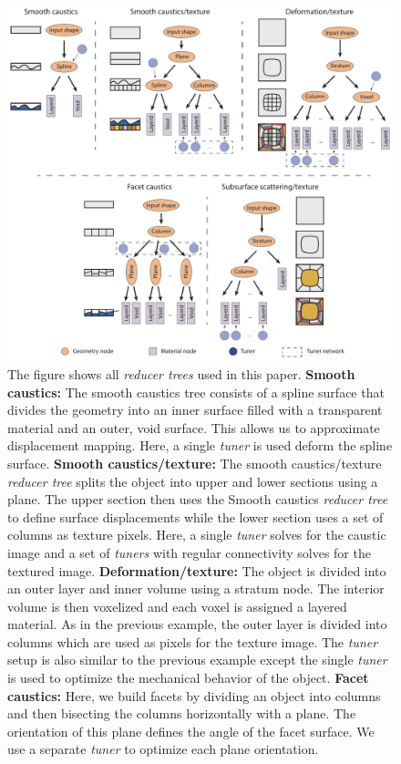 \begin{figure}[t]
\centering
\includegraphics*[clip, width = \linewidth]{figure/ReducerNetworksSuplemental}
\caption{The figure shows all \emph{reducer trees} used in this paper.
\textbf{Smooth caustics:} The smooth caustics tree consists of a spline surface that divides the geometry into an inner surface filled with a transparent material and an outer, void surface. This allows us to approximate displacement mapping.  Here, a single \emph{tuner} is used deform the spline surface.
\textbf{Smooth caustics/texture:} The smooth caustics/texture \emph{reducer tree} splits the object into upper and lower sections using a plane. The upper section then uses the Smooth caustics \emph{reducer tree} to define surface displacements while the lower section uses a set of columns as texture pixels. Here, a single \emph{tuner} solves for the caustic image and a set of \emph{tuners} with regular connectivity solves for the textured image.  \textbf{Deformation/texture:} The object is divided into an outer layer and inner volume using a stratum node. The interior volume is then voxelized and each voxel is assigned a layered material. As in the previous example, the outer layer is divided into columns which are used as pixels for the texture image. The \emph{tuner} setup is also similar to the previous example except the single \emph{tuner} is used to optimize the mechanical behavior of the object. \textbf{Facet caustics:} Here, we build facets by dividing an object into columns and then bisecting the columns horizontally with a plane. The orientation of this plane defines the angle of the facet surface. We use a separate \emph{tuner} to optimize each plane orientation.
}
\end{figure}
